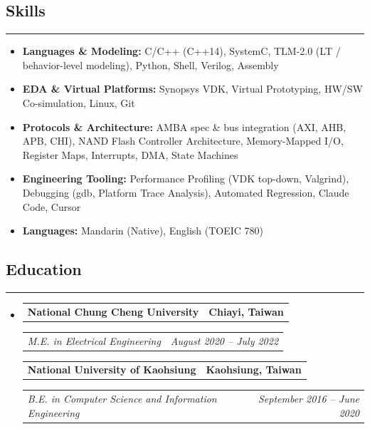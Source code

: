 \documentclass[11pt,a4paper]{article}
\makeatletter
\newcommand{\headerrow}[2]
{\begin{tabular*}{\linewidth}{l@{\extracolsep{\fill}}r}
#1 &
#2 \\
\end{tabular*}}
\makeatother
\begin{document}
\subsection*{\large Skills\vphantom{y}}
\hrule
\vspace{0.3em}

\begin{itemize}[leftmargin=1em,noitemsep]
	\item \textbf{Languages \& Modeling:}
	      C/C++ (C++14), SystemC, TLM-2.0 (LT / behavior-level modeling), Python, Shell, Verilog, Assembly
	\item \textbf{EDA \& Virtual Platforms:}
	      Synopsys VDK, Virtual Prototyping, HW/SW Co-simulation, Linux, Git
	\item \textbf{Protocols \& Architecture:}
	      AMBA spec \& bus integration (AXI, AHB, APB, CHI), NAND Flash Controller Architecture, Memory-Mapped I/O, Register Maps, Interrupts, DMA, State Machines
	\item \textbf{Engineering Tooling:}
	      Performance Profiling (VDK top-down, Valgrind), Debugging (gdb, Platform Trace Analysis), Automated Regression, Claude Code, Cursor
    \item \textbf{Languages:}
          Mandarin (Native), English (TOEIC 780)
\end{itemize}

\subsection*{\large Education}
\hrule
\vspace{0.3em}

\begin{itemize}[leftmargin=1em]
	\parskip=0.1em
		
	\item
	      \headerrow
	      {\textbf{National Chung Cheng University}}
	      {\textbf{Chiayi, Taiwan}}
	      \headerrow
	      {\emph{M.E. in Electrical Engineering}}
	      {\emph{August 2020 -- July 2022}}
          \par{}\par
          
	      \headerrow
          {\textbf{National University of Kaohsiung}}
	      {\textbf{Kaohsiung, Taiwan}}
          \headerrow
	      {\emph{B.E. in Computer Science and Information Engineering}}
	      {\emph{September 2016 -- June 2020}}
\end{itemize}
\end{document}
